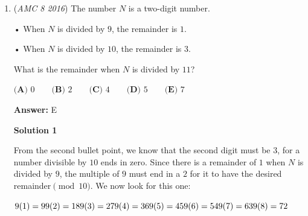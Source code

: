 \begin{enumerate}
 \textbf{Answer: }B



\textbf{Solution 1}

When Cheenu was a boy, he could run $15$ miles in $3$ hours and $30$ minutes $= 3\times60 + 30$ minutes $= 210$ minutes, thus running $\frac{210}{15} = 14$ minutes per mile. Now that he is an old man, he can walk $10$ miles in $4$ hours $= 4 \times 60$ minutes $= 240$ minutes, thus walking $\frac{240}{10} = 24$ minutes per mile. Therefore, it takes him $\boxed{\textbf{(B)}\ 10}$ minutes longer to walk a mile now compared to when he was a boy.

 



\textbf{Solution 2}

From the question, the old man can travel five miles in two hours, so we can set both speeds to $15$ miles. We can see that Cheenu as an old man takes $2$ hours and $30$ minutes for him to travel $15$ miles, which is also $150$ minutes. We can then divide this by fifteen, which gives us $10$, thus the answer is $\boxed{\textbf{B) 10}}$



	\item (\textit{AMC 8 2016}) The number $N$ is a two-digit number.


 • When $N$ is divided by $9$, the remainder is $1$.


 • When $N$ is divided by $10$, the remainder is $3$.


 What is the remainder when $N$ is divided by $11$?


 

$\textbf{(A) }0\qquad\textbf{(B) }2\qquad\textbf{(C) }4\qquad\textbf{(D) }5\qquad \textbf{(E) }7$

 \textbf{Answer: }E



\textbf{Solution 1}

From the second bullet point, we know that the second digit must be $3$, for a number divisible by $10$ ends in zero. Since there is a remainder of $1$ when $N$ is divided by $9$, the multiple of $9$ must end in a $2$ for it to have the desired remainder$\pmod {10}.$ We now look for this one: 

 $9(1)=9\\ 9(2)=18\\ 9(3)=27\\ 9(4)=36\\ 9(5)=45\\ 9(6)=54\\ 9(7)=63\\ 9(8)=72$


\end{enumerate}
